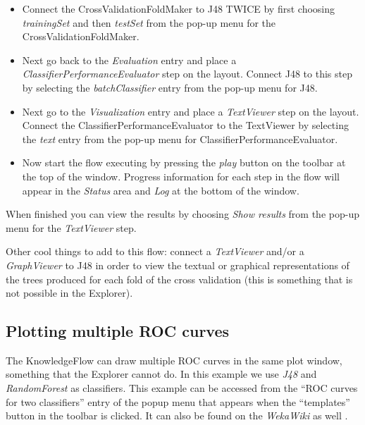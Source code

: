 \begin{itemize}
	\item Connect the CrossValidationFoldMaker to J48 TWICE by first choosing
	\textit{trainingSet} and then \textit{testSet} from the pop-up menu for the
	CrossValidationFoldMaker.

	\item Next go back to the \textit{Evaluation} entry and place
          a \textit{ClassifierPerformanceEvaluator} step on the
          layout. Connect J48 to this step by selecting the
          \textit{batchClassifier} entry from the pop-up menu for J48.

	\item Next go to the \textit{Visualization} entry and place a \textit{TextViewer}
	step on the layout. Connect the ClassifierPerformanceEvaluator to
	the TextViewer by selecting the \textit{text} entry from the pop-up menu for
	ClassifierPerformanceEvaluator.

	\item Now start the flow executing by pressing the
          \textit{play} button on the toolbar at the top of the
          window. Progress information for each step in the flow
          will appear in the \textit{Status} area and \textit{Log} at
          the bottom of the window.
\end{itemize}

When finished you can view the results by choosing \textit{Show results} from
the pop-up menu for the \textit{TextViewer} step.

Other cool things to add to this flow: connect a \textit{TextViewer} and/or a
\textit{GraphViewer} to J48 in order to view the textual or graphical
representations of the trees produced for each fold of the cross
validation (this is something that is not possible in the Explorer).


\newpage
\subsection{Plotting multiple ROC curves}
\label{exampleroc}
The KnowledgeFlow can draw multiple ROC curves in the same plot
window, something that the Explorer cannot do. In this example we use
\textit{J48} and \textit{RandomForest} as classifiers. This example
can be accessed from the ``ROC curves for two classifiers'' entry of
the popup menu that appears when the ``templates'' button in the
toolbar is clicked. It can also be found on the \textit{WekaWiki}
as well \cite{multipleroc}.

